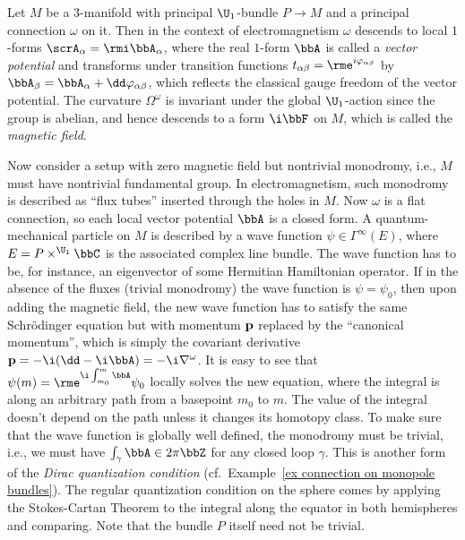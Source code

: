 \begin{example}
    Let $M$ be a $3$-manifold with principal $\U_1$-bundle $P\to M$ and a principal connection $\omega$ on it. Then in the context of electromagnetism $\omega$ descends to local $1$-forms $\scrA_\alpha=\rmi \bbA_\alpha$, where the real $1$-form $\bbA$ is called a \emph{vector potential} and transforms under transition functions $t_{\alpha\beta}=\rme^{i\varphi_{\alpha\beta}}$ by $\bbA_\beta=\bbA_\alpha+\dd \varphi_{\alpha\beta}$, which reflects the classical gauge freedom of the vector potential. The curvature $\Omega^\omega$ is invariant under the global $\U_1$-action since the group is abelian, and hence descends to a form $\i \bbF$ on $M$, which is called the \emph{magnetic field}. 
    
    Now consider a setup with zero magnetic field but nontrivial monodromy, i.e., $M$ must have nontrivial fundamental group. In electromagnetism, such monodromy is described as ``flux tubes'' inserted through the holes in $M$. Now $\omega$ is a flat connection, so each local vector potential $\bbA$ is a closed form. A quantum-mechanical particle on $M$ is described by a wave function $\psi\in \Gamma^\infty(E)$, where $E=P\times^{\U_1}\bbC$ is the associated complex line bundle. The wave function has to be, for instance, an eigenvector of some Hermitian Hamiltonian operator. If in the absence of the fluxes (trivial monodromy) the wave function is $\psi=\psi_0$, then upon adding the magnetic field, the new wave function has to satisfy the same Schr\"odinger equation but with momentum $\bf{p}$ replaced by the ``canonical momentum'', which is simply the covariant derivative $\bf{p}=-\i (\dd-\i \bbA)=-\i\nabla^\omega$. It is easy to see that $\psi(m)=\rme^{\i \int_{m_0}^m \bbA }\psi_0$ locally solves the new equation, where the integral is along an arbitrary path from a basepoint $m_0$ to $m$. The value of the integral doesn't depend on the path unless it changes its homotopy class. To make sure that the wave function is globally well defined, the monodromy must be trivial, i.e., we must have $\int_\gamma \bbA\in 2\pi\bbZ$ for any closed loop $\gamma$. This is another form of the \emph{Dirac quantization condition} (cf.\ Example~\ref{ex connection on monopole bundles}). The regular quantization condition on the sphere comes by applying the Stokes-Cartan Theorem to the integral along the equator in both hemispheres and comparing. Note that the bundle $P$ itself need not be trivial. 


\end{example}
